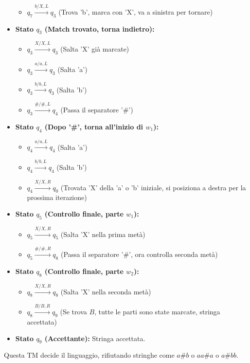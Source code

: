 \documentclass[a4paper]{article}
\begin{document}
\begin{itemize}
\begin{itemize}
            \item $q_7 \xrightarrow{b / X, L} q_3$ (Trova 'b', marca con 'X', va a sinistra per tornare)
        \end{itemize}
    \item \textbf{Stato $q_3$ (Match trovato, torna indietro):}
        \begin{itemize}
            \item $q_3 \xrightarrow{X / X, L} q_3$ (Salta 'X' già marcate)
            \item $q_3 \xrightarrow{a / a, L} q_3$ (Salta 'a')
            \item $q_3 \xrightarrow{b / b, L} q_3$ (Salta 'b')
            \item $q_3 \xrightarrow{\# / \#, L} q_4$ (Passa il separatore '\#')
        \end{itemize}
    \item \textbf{Stato $q_4$ (Dopo '\#', torna all'inizio di $w_1$):}
        \begin{itemize}
            \item $q_4 \xrightarrow{a / a, L} q_4$ (Salta 'a')
            \item $q_4 \xrightarrow{b / b, L} q_4$ (Salta 'b')
            \item $q_4 \xrightarrow{X / X, R} q_0$ (Trovata 'X' della 'a' o 'b' iniziale, si posiziona a destra per la prossima iterazione)
        \end{itemize}
    \item \textbf{Stato $q_5$ (Controllo finale, parte $w_1$):}
        \begin{itemize}
            \item $q_5 \xrightarrow{X / X, R} q_5$ (Salta 'X' nella prima metà)
            \item $q_5 \xrightarrow{\# / \#, R} q_8$ (Passa il separatore '\#', ora controlla seconda metà)
        \end{itemize}
    \item \textbf{Stato $q_8$ (Controllo finale, parte $w_2$):}
        \begin{itemize}
            \item $q_8 \xrightarrow{X / X, R} q_8$ (Salta 'X' nella seconda metà)
            \item $q_8 \xrightarrow{B / B, R} q_9$ (Se trova $B$, tutte le parti sono state marcate, stringa accettata)
        \end{itemize}
    \item \textbf{Stato $q_9$ (Accettante):} Stringa accettata.
\end{itemize}
Questa TM decide il linguaggio, rifiutando stringhe come $a\#b$ o $aa\#a$ o $a\#bb$.
\end{document}
